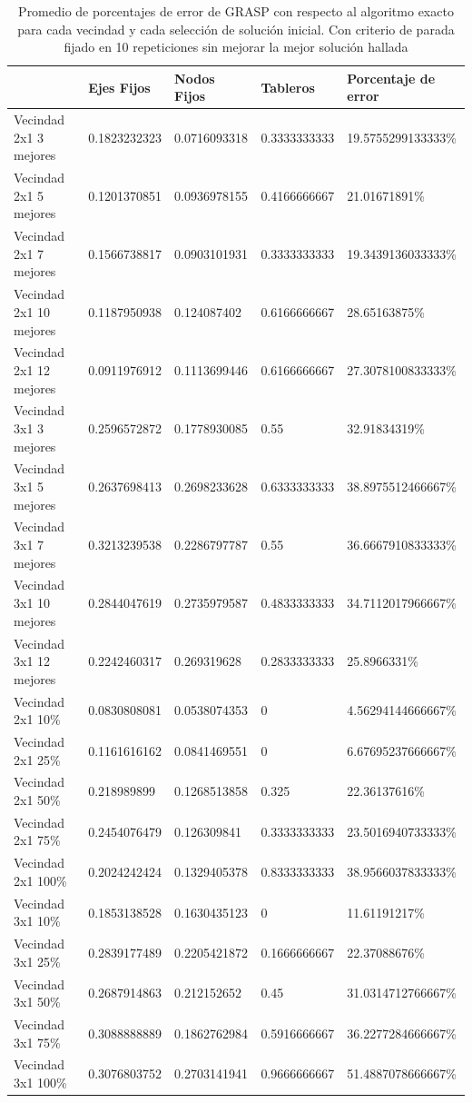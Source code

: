 \begin{table}[h!]
	\begin{tabular}[c]{|l|l|l|l|l|}
	\hline & Ejes Fijos & Nodos Fijos & Tableros & Porcentaje de error \\
	\hline Vecindad 2x1 3 mejores & 0.1823232323 & 0.0716093318 & 0.3333333333 & 19.5755299133333\% \\
	\hline Vecindad 2x1 5 mejores & 0.1201370851 & 0.0936978155 & 0.4166666667 & 21.01671891\% \\
	\hline Vecindad 2x1 7 mejores & 0.1566738817 & 0.0903101931 & 0.3333333333 & 19.3439136033333\% \\
	\hline Vecindad 2x1 10 mejores & 0.1187950938 & 0.124087402 & 0.6166666667 & 28.65163875\% \\
	\hline Vecindad 2x1 12 mejores & 0.0911976912 & 0.1113699446 & 0.6166666667 & 27.3078100833333\% \\
	\hline Vecindad 3x1 3 mejores & 0.2596572872 & 0.1778930085 & 0.55 & 32.91834319\% \\
	\hline Vecindad 3x1 5 mejores & 0.2637698413 & 0.2698233628 & 0.6333333333 & 38.8975512466667\% \\
	\hline Vecindad 3x1 7 mejores & 0.3213239538 & 0.2286797787 & 0.55 & 36.6667910833333\% \\
	\hline Vecindad 3x1 10 mejores & 0.2844047619 & 0.2735979587 & 0.4833333333 & 34.7112017966667\% \\
	\hline Vecindad 3x1 12 mejores & 0.2242460317 & 0.269319628 & 0.2833333333 & 25.8966331\% \\
	\hline Vecindad 2x1 10\% & 0.0830808081 & 0.0538074353 & 0 & 4.56294144666667\% \\
	\hline Vecindad 2x1 25\% & 0.1161616162 & 0.0841469551 & 0 & 6.67695237666667\% \\
	\hline Vecindad 2x1 50\% & 0.218989899 & 0.1268513858 & 0.325 & 22.36137616\% \\
	\hline Vecindad 2x1 75\% & 0.2454076479 & 0.126309841 & 0.3333333333 & 23.5016940733333\% \\
	\hline Vecindad 2x1 100\% & 0.2024242424 & 0.1329405378 & 0.8333333333 & 38.9566037833333\% \\
	\hline Vecindad 3x1 10\% & 0.1853138528 & 0.1630435123 & 0 & 11.61191217\% \\
	\hline Vecindad 3x1 25\% & 0.2839177489 & 0.2205421872 & 0.1666666667 & 22.37088676\% \\
	\hline Vecindad 3x1 50\% & 0.2687914863 & 0.212152652 & 0.45 & 31.0314712766667\% \\
	\hline Vecindad 3x1 75\% & 0.3088888889 & 0.1862762984 & 0.5916666667 & 36.2277284666667\% \\
	\hline Vecindad 3x1 100\% & 0.3076803752 & 0.2703141941 & 0.9666666667 & 51.4887078666667\% \\
	\hline
	\end{tabular}
\caption{Promedio de porcentajes de error de GRASP con respecto al algoritmo exacto para cada vecindad y cada selecci\'on de soluci\'on inicial. Con criterio de parada fijado en 10 repeticiones sin mejorar la mejor soluci\'on hallada}
\end{table}

